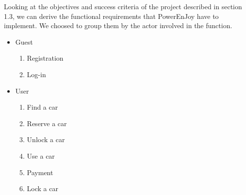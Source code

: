 Looking at the objectives and success criteria of the project described in section 1.3, we can derive the functional requirements that PowerEnJoy have to implement. We choosed to group them by the actor involved in the function.
\begin{itemize}
  \item Guest
  \begin{enumerate}
    \item Registration
    \item Log-in
  \end{enumerate}
  \item User
  \begin{enumerate}
    \item Find a car
    \item Reserve a car
    \item Unlock a car
    \item Use a car
    \item Payment
    \item Lock a car
  \end{enumerate}
\end{itemize}

